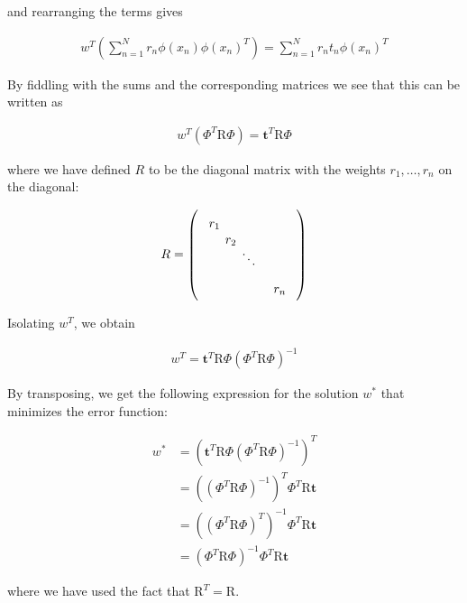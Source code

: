 \documentclass[a4paper]{article}
\begin{document}
and rearranging the terms gives

\begin{align*} %
w^T \left( \sum_{n=1}^{N} r_n \phi(x_n) \phi(x_n)^T \right) = \sum_{n=1}^{N} r_n t_n \phi(x_n)^T
\end{align*}

By fiddling with the sums and the corresponding matrices we see that this can be written as

\begin{align*} %
w^T \left( \Phi^T \mathrm{R} \Phi \right) = \bm{t}^T \mathrm{R} \Phi
\end{align*}

where we have defined $R$ to be the diagonal matrix with the weights $r_1, \dots, r_n$ on the diagonal:

\begin{align*} %
\setlength\unitlength{13pt}
R =
\left(\begin{picture}(6,3)(0,-3)
\put(1,-1){\makebox(0,0){$r_1$}}
\put(2,-2){\makebox(0,0){$r_2$}}
\put(2.8,-2.8){\makebox(0,0){$\cdot$}}
\put(3.1,-3.1){\makebox(0,0){$\cdot$}}
\put(3.4,-3.4){\makebox(0,0){$\cdot$}}
\put(5,-5){\makebox(0,0){$r_n$}}
\end{picture}
\right)
\end{align*}

Isolating $w^T$, we obtain

\begin{align*} %
w^T = \bm{t}^T \mathrm{R} \Phi \left( \Phi^T \mathrm{R} \Phi \right)^{-1}
\end{align*}

By transposing, we get the following expression for the solution $w^*$ that minimizes the error function:

\begin{align*} %
w^* &= \left( \bm{t}^T \mathrm{R} \Phi \left( \Phi^T \mathrm{R} \Phi \right)^{-1} \right) ^T
\\ &= \left( \left( \Phi^T \mathrm{R} \Phi \right)^{-1} \right)^T \Phi^T \mathrm{R} \bm{t}
\\ &= \left( \left( \Phi^T \mathrm{R} \Phi \right)^T \right)^{-1} \Phi^T \mathrm{R} \bm{t}
\\ &= \left( \Phi^T \mathrm{R} \Phi \right)^{-1} \Phi^T \mathrm{R} \bm{t}
\end{align*}

where we have used the fact that $\mathrm{R}^T = \mathrm{R}$.
\end{document}
